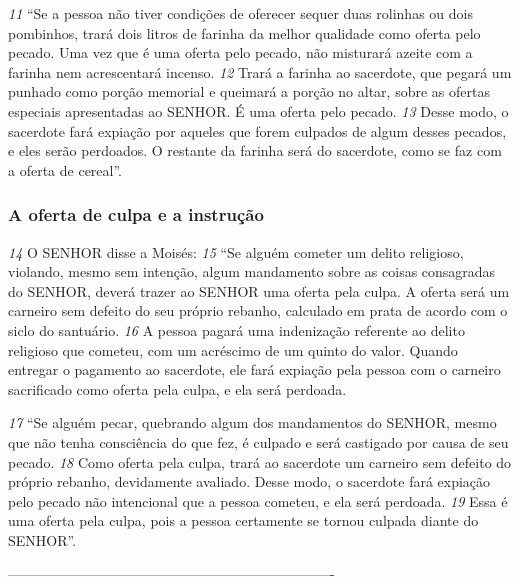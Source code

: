 \smallskip
\textit{\tiny 11}
“Se a pessoa não tiver condições de oferecer sequer duas rolinhas ou dois
pombinhos, trará dois litros de farinha da melhor qualidade como oferta pelo
pecado. Uma vez que é uma oferta pelo pecado, não misturará azeite com a
farinha nem acrescentará incenso. 
\textit{\tiny 12}
Trará a farinha ao sacerdote, que pegará um
punhado como porção memorial e queimará a porção no altar, sobre as ofertas
especiais apresentadas ao SENHOR. É uma oferta pelo pecado. 
\textit{\tiny 13}
Desse modo, o
sacerdote fará expiação por aqueles que forem culpados de algum desses
pecados, e eles serão perdoados. O restante da farinha será do sacerdote, como se
faz com a oferta de cereal”.

\bigskip
\subsubsection*{A oferta de culpa e a instrução}
\textit{\tiny 14}
O SENHOR disse a Moisés: 
\textit{\tiny 15}
“Se alguém cometer um delito religioso, violando,
mesmo sem intenção, algum mandamento sobre as coisas consagradas do SENHOR,
deverá trazer ao SENHOR uma oferta pela culpa. 
A oferta será um carneiro sem
defeito do seu próprio rebanho, calculado em prata de acordo com o siclo do
santuário. 
\textit{\tiny 16}
A pessoa pagará uma indenização referente ao delito religioso que
cometeu, com um acréscimo de um quinto do valor. Quando entregar o
pagamento ao sacerdote, ele fará expiação pela pessoa com o carneiro sacrificado
como oferta pela culpa, e ela será perdoada.
  
\bigskip
\textit{\tiny 17}
“Se alguém pecar, quebrando algum dos mandamentos do SENHOR, mesmo
que não tenha consciência do que fez, é culpado e será castigado por causa de seu
pecado. 
\textit{\tiny 18}
Como oferta pela culpa, trará ao sacerdote um carneiro sem defeito do
próprio rebanho, devidamente avaliado. Desse modo, o sacerdote fará expiação
pelo pecado não intencional que a pessoa cometeu, e ela será perdoada. 
\textit{\tiny 19}
Essa é
uma oferta pela culpa, pois a pessoa certamente se tornou culpada diante do
SENHOR”.

----------------------------------------------------------------------
